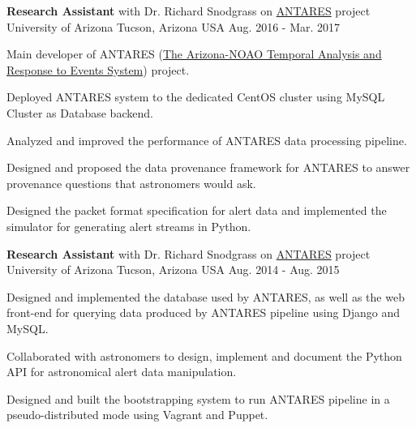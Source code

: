 

\begin{cventries}

  \cventry
    {\textbf{Research Assistant} with Dr. Richard Snodgrass on \href{https://www.noao.edu/ANTARES/}{ANTARES} project} %
    {University of Arizona} %
    {Tucson, Arizona USA} %
    {Aug. 2016 - Mar. 2017} %
    {
      \begin{cvitems} %
        \item {Main developer of ANTARES
    (\href{https://www.noao.edu/ANTARES/}{The Arizona-NOAO Temporal 
    Analysis and Response to Events System}) project.} 
        \item {Deployed ANTARES system to the dedicated CentOS
    cluster using MySQL Cluster as Database backend.}
        \item {Analyzed and improved the performance of ANTARES data
    processing pipeline.}
        \item {Designed and proposed the data provenance framework for
    ANTARES to answer provenance questions that astronomers would ask.}
        \item {Designed the packet format specification for alert data
        and implemented the simulator for generating alert streams in Python.}
      \end{cvitems}
    }

  \cventry
    {\textbf{Research Assistant} with Dr. Richard Snodgrass on \href{https://www.noao.edu/ANTARES/}{ANTARES} project} %
    {University of Arizona} %
    {Tucson, Arizona USA} %
    {Aug. 2014 - Aug. 2015} %
    {
      \begin{cvitems} %
        \item {Designed and implemented the database used by ANTARES,
    as well as the web front-end for querying data produced by ANTARES
    pipeline using Django and MySQL.} 
        \item {Collaborated with astronomers to design, implement
    and document the Python API for astronomical alert data manipulation.}
        \item {Designed and built the bootstrapping
    system to run ANTARES pipeline in a pseudo-distributed mode
    using Vagrant and Puppet.}
      \end{cvitems}
    }


\end{cventries}
